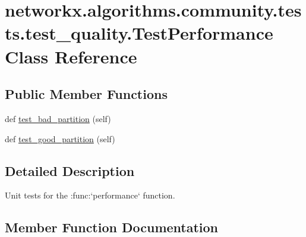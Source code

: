 \hypertarget{classnetworkx_1_1algorithms_1_1community_1_1tests_1_1test__quality_1_1TestPerformance}{}\section{networkx.\+algorithms.\+community.\+tests.\+test\+\_\+quality.\+Test\+Performance Class Reference}
\label{classnetworkx_1_1algorithms_1_1community_1_1tests_1_1test__quality_1_1TestPerformance}
\subsection*{Public Member Functions}
\begin{DoxyCompactItemize}
\item 
def \hyperlink{classnetworkx_1_1algorithms_1_1community_1_1tests_1_1test__quality_1_1TestPerformance_a7b34e5ee1b3b24e035396e4b972167a5}{test\+\_\+bad\+\_\+partition} (self)
\item 
def \hyperlink{classnetworkx_1_1algorithms_1_1community_1_1tests_1_1test__quality_1_1TestPerformance_aaa8643138cfc012d5ae7d69ca6ef2914}{test\+\_\+good\+\_\+partition} (self)
\end{DoxyCompactItemize}


\subsection{Detailed Description}
\begin{DoxyVerb}Unit tests for the :func:`performance` function.\end{DoxyVerb}
 

\subsection{Member Function Documentation}
\mbox{\label{classnetworkx_1_1algorithms_1_1community_1_1tests_1_1test__quality_1_1TestPerformance_a7b34e5ee1b3b24e035396e4b972167a5}} 
